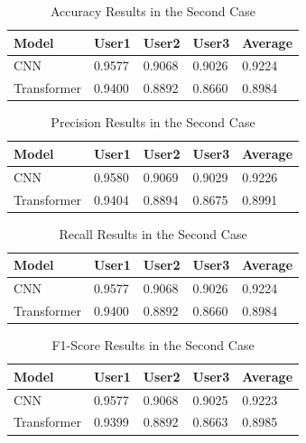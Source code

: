 \begin{table}[H]
    \centering
    \caption{Accuracy Results in the Second Case}
    \label{table:results_second_case_acc}
    \begin{tabular}{|l|l|l|l|l|}
        \hline
        Model & User1 & User2 & User3 & Average \\
        \hline
        CNN & 0.9577 & 0.9068 & 0.9026 & 0.9224 \\
        \hline
        Transformer & 0.9400 & 0.8892 &  0.8660 & 0.8984 \\
        \hline
    \end{tabular}
\end{table}

\begin{table}[H]
    \centering
    \caption{Precision Results in the Second Case}
    \label{table:results_second_case_precision}
    \begin{tabular}{|l|l|l|l|l|}
        \hline
        Model & User1 & User2 & User3 & Average \\
        \hline
        CNN & 0.9580 & 0.9069 & 0.9029 & 0.9226 \\
        \hline
        Transformer & 0.9404 & 0.8894 & 0.8675 & 0.8991 \\
        \hline
    \end{tabular}
\end{table}

\begin{table}[H]
    \centering
    \caption{Recall Results in the Second Case}
    \label{table:results_second_case_recall}
    \begin{tabular}{|l|l|l|l|l|}
        \hline
        Model & User1 & User2 & User3 & Average \\
        \hline
        CNN & 0.9577 & 0.9068 & 0.9026 & 0.9224 \\
        \hline
        Transformer & 0.9400 & 0.8892 & 0.8660 & 0.8984 \\
        \hline
    \end{tabular}
\end{table}

\begin{table}[H]
    \centering
    \caption{F1-Score Results in the Second Case}
    \label{table:results_second_case_f1_score}
    \begin{tabular}{|l|l|l|l|l|}
        \hline
        Model & User1 & User2 & User3 & Average \\
        \hline
        CNN & 0.9577 & 0.9068 & 0.9025 & 0.9223 \\
        \hline
        Transformer & 0.9399 & 0.8892 & 0.8663 & 0.8985 \\
        \hline
    \end{tabular}
\end{table}

